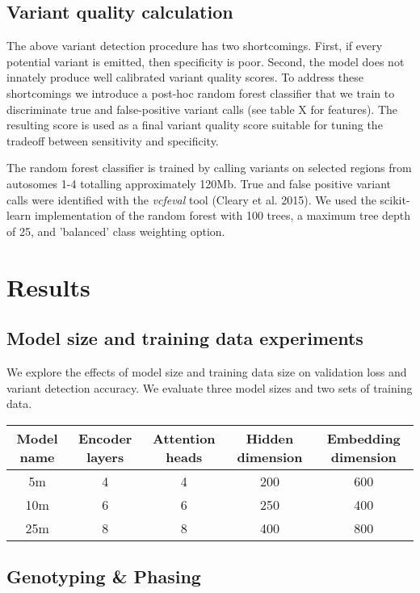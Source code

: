 \documentclass[]{article}
\begin{document}
\subsection{Variant quality calculation}

The above variant detection procedure has two shortcomings. First, if every potential variant is emitted, then specificity is poor. Second, the model does not innately produce well calibrated variant quality scores. To address these shortcomings we introduce a post-hoc random forest classifier that we train to discriminate true and false-positive variant calls (see table X for features).  The resulting score is used as a final variant quality score suitable for tuning the tradeoff between sensitivity and specificity. 

The random forest classifier is trained by calling variants on selected regions from autosomes 1-4 totalling approximately 120Mb. True and false positive variant calls were identified with the \textit{vcfeval} tool (Cleary et al. 2015). We used the scikit-learn implementation of the random forest with 100 trees, a maximum tree depth of 25, and 'balanced' class weighting option.  


\section{Results}

\subsection{Model size and training data experiments}

We explore the effects of model size and training data size on validation loss and variant detection accuracy. We evaluate three model sizes and two sets of training data.

\begin{center}
	\begin{tabular}{ |c|c|c|c|c| }
	 Model name & Encoder layers & Attention heads & Hidden dimension & Embedding dimension \\ 
	\hline
	 5m & 4 & 4 & 200 & 600 \\ 
	 10m & 6 & 6 & 250 & 400 \\ 
	 25m & 8 & 8 & 400 & 800 \\ 
	 \hline
	\end{tabular}
\end{center}



\subsection{Genotyping \& Phasing}
\end{document}
